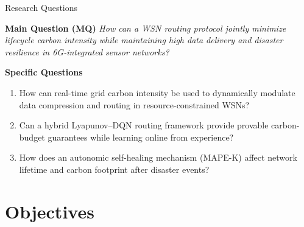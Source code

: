 \documentclass[aspectratio=169, 11pt]{beamer}
\begin{document}
\begin{frame}{Research Questions}
\begin{block}{\textbf{Main Question (MQ)}}
\textit{How can a WSN routing protocol jointly minimize lifecycle carbon intensity while maintaining high data delivery and disaster resilience in 6G-integrated sensor networks?}
\end{block}

\vspace{2mm}
\begin{alertblock}{\textbf{Specific Questions}}
\begin{enumerate}[nosep]
    \item[\textbf{SQ1}] How can real-time grid carbon intensity be used to dynamically modulate data compression and routing in resource-constrained WSNs?

    \vspace{1mm}
    \item[\textbf{SQ2}] Can a hybrid Lyapunov--DQN routing framework provide provable carbon-budget guarantees while learning online from experience?

    \vspace{1mm}
    \item[\textbf{SQ3}] How does an autonomic self-healing mechanism (MAPE-K) affect network lifetime and carbon footprint after disaster events?
\end{enumerate}
\end{alertblock}
\end{frame}

\section{Objectives}
\end{document}
